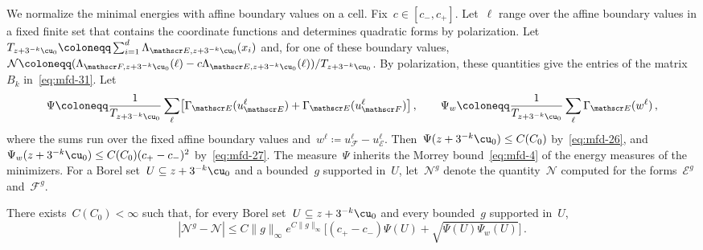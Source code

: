 \documentclass[11pt]{amsart}
\begin{document}
We normalize the minimal energies with affine boundary values on a cell. Fix~$c\in[c_-,c_+]$. Let~$\ell$ range over the affine boundary values in a fixed finite set that contains the coordinate functions and determines quadratic forms by polarization. Let~$T_{z+3^{-k}\cu_0}\coloneqq\sum_{i=1}^d\Lambda_{\mathscr E,z+3^{-k}\cu_0}(x_i)$ and, for one of these boundary values,~$\mathcal N\coloneqq(\Lambda_{\mathscr F,z+3^{-k}\cu_0}(\ell)-c\Lambda_{\mathscr E,z+3^{-k}\cu_0}(\ell))/T_{z+3^{-k}\cu_0}$. By polarization, these quantities give the entries of the matrix~$B_k$ in~\eqref{eq:mfd-31}. Let
\begin{equation*}
	\Psi\coloneqq\frac{1}{T_{z+3^{-k}\cu_0}}\sum_{\ell}\bigl[\Gamma_{\mathscr E}(u_{\mathscr E}^{\ell})+\Gamma_{\mathscr E}(u_{\mathscr F}^{\ell})\bigr]\,,
	\qquad
	\Psi_w\coloneqq\frac{1}{T_{z+3^{-k}\cu_0}}\sum_{\ell}\Gamma_{\mathscr E}(w^{\ell})\,,
\end{equation*}
where the sums run over the fixed affine boundary values and~$w^\ell\coloneqq u_{\mathscr F}^\ell-u_{\mathscr E}^\ell$. Then~$\Psi(z+3^{-k}\cu_0)\leq C(C_0)$ by~\eqref{eq:mfd-26}, and~$\Psi_w(z+3^{-k}\cu_0)\leq C(C_0)(c_+-c_-)^2$ by~\eqref{eq:mfd-27}. The measure~$\Psi$ inherits the Morrey bound~\eqref{eq:mfd-4} of the energy measures of the minimizers. For a Borel set~$U\subseteq z+3^{-k}\cu_0$ and a bounded~$g$ supported in~$U$, let~$\mathcal N^g$ denote the quantity~$\mathcal N$ computed for the forms~$\mathscr E^g$ and~$\mathscr F^g$.

\begin{lemma}
\label{mfd:lem-relvar}
There exists~$C(C_0)<\infty$ such that, for every Borel set~$U\subseteq z+3^{-k}\cu_0$ and every bounded~$g$ supported in~$U$,
\begin{equation}
	|\mathcal N^g-\mathcal N|\leq C\|g\|_\infty e^{C\|g\|_\infty}
	\bigl[(c_+-c_-)\Psi(U)+\sqrt{\Psi(U)\Psi_w(U)}\bigr]\,.
	\label{eq:mfd-30}
\end{equation}
\end{lemma}
\end{document}
